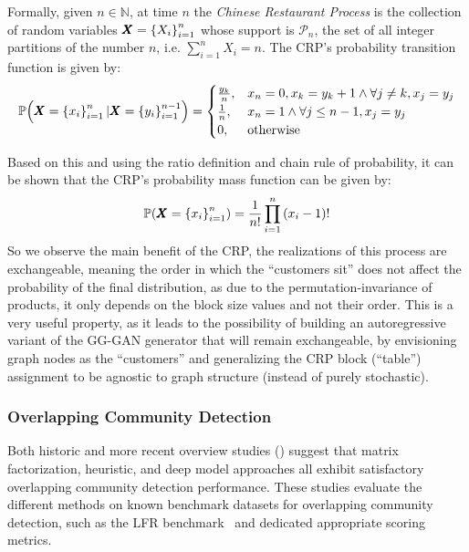 \begin{definition}
    Formally, given $n \in \mathbb{N}$, at time $n$ the \emph{Chinese Restaurant Process} is the collection of random variables $\pmb{X}=\mathopen{}\left\{X_i\right\}_{i=1}^{n}$ whose support is $\mathcal{P}_n$, the set of all integer partitions of the number $n$, i.e. $\sum_{i=1}^{n}{X_i}=n$. The CRP's probability transition function is given by: 
\begin{equation}
\mathbb{P}\mathopen{}\left(\pmb{X}=\mathopen{}\left\{x_i\right\}_{i=1}^{n} \vert \pmb{X}=\mathopen{}\left\{y_i\right\}_{i=1}^{n-1}\right)
= \begin{cases} 
\frac{y_k}{n}, & x_n=0, x_k = y_k+1 \wedge \forall j \neq k, x_j=y_j \\
\frac{1}{n}, & x_n = 1 \wedge \forall j \leq n-1, x_j=y_j \\
0, & \text{otherwise} \end{cases}
\end{equation}
\end{definition}

Based on this and using the ratio definition and chain rule of probability, it can be shown that the CRP's probability mass function can be given by: 
\begin{equation}
\mathbb{P}\mathopen{}\left(\pmb{X}=\mathopen{}\left\{x_i\right\}_{i=1}^{n}\right) = \frac{1}{n!}\prod_{i=1}^{n}{\mathopen{}\left(x_i - 1\right)!}
\end{equation}
So we observe the main benefit of the CRP, the realizations of this process are exchangeable, meaning the order in which the \enquote{customers sit} does not affect the probability of the final distribution, as due to the permutation-invariance of products, it only depends on the block size values and not their order. This is a very useful property, as it leads to the possibility of building an autoregressive variant of the GG-GAN generator that will remain exchangeable, by envisioning graph nodes as the \enquote{customers} and generalizing the CRP block (\enquote{table}) assignment to be agnostic to graph structure (instead of purely stochastic).

\subsubsection{Overlapping Community Detection}
Both historic and more recent overview studies (\cite{xie_overlapping_2013, li_deeper_2018, liu_deep_2020, vieira_comparative_2020}) suggest that matrix factorization, heuristic, and deep model approaches all exhibit satisfactory overlapping community detection performance. These studies evaluate the different methods on known benchmark datasets for overlapping community detection, such as the LFR benchmark~\cite{lancichinetti_benchmarks_2009} and dedicated appropriate scoring metrics.

